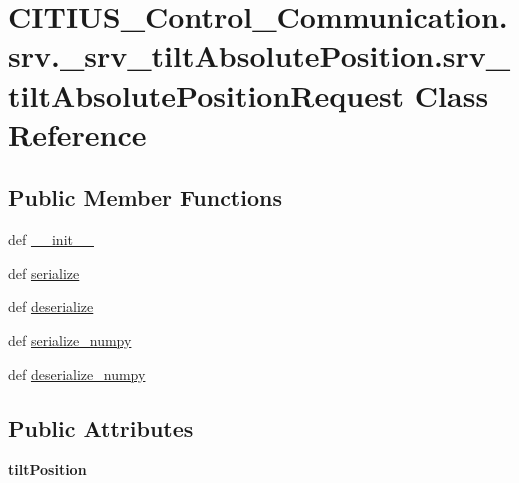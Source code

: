 \hypertarget{class_c_i_t_i_u_s___control___communication_1_1srv_1_1__srv__tilt_absolute_position_1_1srv__tilt_absolute_position_request}{\section{\-C\-I\-T\-I\-U\-S\-\_\-\-Control\-\_\-\-Communication.\-srv.\-\_\-srv\-\_\-tilt\-Absolute\-Position.\-srv\-\_\-tilt\-Absolute\-Position\-Request \-Class \-Reference}
\label{class_c_i_t_i_u_s___control___communication_1_1srv_1_1__srv__tilt_absolute_position_1_1srv__tilt_absolute_position_request}
}
\subsection*{\-Public \-Member \-Functions}
\begin{DoxyCompactItemize}
\item 
def \hyperlink{class_c_i_t_i_u_s___control___communication_1_1srv_1_1__srv__tilt_absolute_position_1_1srv__tilt_absolute_position_request_a5bcb2d470f5128bd7db9d06d1eb8c64d}{\-\_\-\-\_\-init\-\_\-\-\_\-}
\item 
def \hyperlink{class_c_i_t_i_u_s___control___communication_1_1srv_1_1__srv__tilt_absolute_position_1_1srv__tilt_absolute_position_request_a480684fa8a6859586beda6044098803d}{serialize}
\item 
def \hyperlink{class_c_i_t_i_u_s___control___communication_1_1srv_1_1__srv__tilt_absolute_position_1_1srv__tilt_absolute_position_request_ae2f8e5de0852f5f5ef57d3d35811e002}{deserialize}
\item 
def \hyperlink{class_c_i_t_i_u_s___control___communication_1_1srv_1_1__srv__tilt_absolute_position_1_1srv__tilt_absolute_position_request_a73300b83198d689990f490e3e445b022}{serialize\-\_\-numpy}
\item 
def \hyperlink{class_c_i_t_i_u_s___control___communication_1_1srv_1_1__srv__tilt_absolute_position_1_1srv__tilt_absolute_position_request_a5e47cc97e6e861fa06af1e275575c3fe}{deserialize\-\_\-numpy}
\end{DoxyCompactItemize}
\subsection*{\-Public \-Attributes}
\begin{DoxyCompactItemize}
\item 
\hypertarget{class_c_i_t_i_u_s___control___communication_1_1srv_1_1__srv__tilt_absolute_position_1_1srv__tilt_absolute_position_request_a6883dd85d42a437faf48079751899f23}{{\bfseries tilt\-Position}}\label{class_c_i_t_i_u_s___control___communication_1_1srv_1_1__srv__tilt_absolute_position_1_1srv__tilt_absolute_position_request_a6883dd85d42a437faf48079751899f23}

\end{DoxyCompactItemize}
